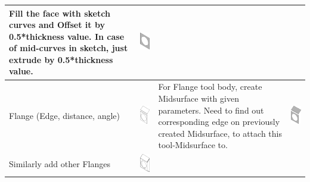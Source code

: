 \begin{longtable}{ L{0.18\textwidth} C{0.18\textwidth} L{0.38\textwidth}  C{0.18\textwidth}}
Fill the face with sketch curves and Offset it by 0.5*thickness value. In case of mid-curves in sketch, just extrude by 0.5*thickness value. &
\includegraphics[scale=0.3]{..//Common/images//DryRun31.png} \\
\hline
Flange (Edge, distance, angle)  &
\includegraphics[scale=0.3]{..//Common/images//DryRun4.png} &
For Flange tool body, create Midsurface with given parameters. Need to find out corresponding edge on previously created Midsurface, to attach this tool-Midsurface to. &
\includegraphics[scale=0.3]{..//Common/images//DryRun41.png} \\
\hline
Similarly add other Flanges  &
\includegraphics[scale=0.23]{..//Common/images//DryRun5.png} &

\end{longtable}
